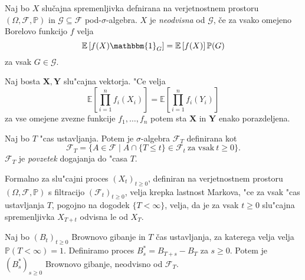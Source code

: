 \documentclass[twoside,11pt]{article}
\begin{document}
%

\begin{definicija}
    Naj bo $X$ slučajna spremenljivka defnirana na verjetnostnem prostoru $(\Omega, \mathcal{F}, \mathbb{P})$
    in $\mathcal{G} \subseteq \mathcal{F}$ pod-$\sigma$-algebra. $X$ je \textit{neodvisna}
    od $\mathcal{G}$, če za vsako omejeno Borelovo funkcijo $f$ velja
    $$
        \mathbb{E}\left[f(X)\mathbbm{1}_G\right] = \mathbb{E}\left[f(X)\right]\mathbb{P}(G)
    $$
    za vsak $G \in \mathcal{G}$.
\end{definicija}

\begin{lema}
    Naj bosta $\mathbf{X}, \mathbf{Y} $ slu"cajna vektorja. "Ce velja 
    $$
        \mathbb{E}\left[\prod_{i=1}^n f_i(X_i)\right] = \mathbb{E}\left[\prod_{i=1}^n f_i(Y_i)\right]
    $$
    za vse omejene zvezne funkcije $f_1, \ldots, f_n$ potem sta $\mathbf{X}$ in $\mathbf{Y}$ enako porazdeljena.
    \label{lema:4}
\end{lema}

\begin{definicija}
    Naj bo $T$ "cas ustavljanja. Potem  je $\sigma$-algebra $\mathcal{F}_T$ definirana kot
    $$
        \mathcal{F}_T = \{A \in \mathcal{F} \mid A \cap \{T \leq t\} \in \mathcal{F}_t \ \text{za vsak} \ t\geq 0\}.
    $$
    $\mathcal{F}_T$ je \textit{povzetek} dogajanja do "casa $T$.
\end{definicija}

Formalno za slu"cajni proces $(X_t)_{t\geq0}$, definiran na verjetnostnem prostoru $(\Omega, \mathcal{F}, \mathbb{P})$ s filtracijo $(\mathcal{F}_t)_{t\geq0}$, velja
krepka lastnost Markova, "ce za vsak "cas ustavljanja $T$, pogojno na dogodek $\{T < \infty\}$, velja, da je za vsak $t \geq 0$ slu"cajna spremenljivka  $X_{T + t}$ odvisna le od $X_T$.

\begin{izrek}
    Naj bo $(B_t)_{t\geq 0}$ Brownovo gibanje in $T$ čas ustavljanja, za katerega velja velja $\mathbb{P}(T<\infty )=1$.
    Definiramo proces $B^*_s = B_{T + s} - B_T$ za $s\geq0$. Potem je $(B^*_s)_{s\geq0}$ Brownovo
    gibanje, neodvisno od $\mathcal{F}_T$.
\end{izrek}
\end{document}
